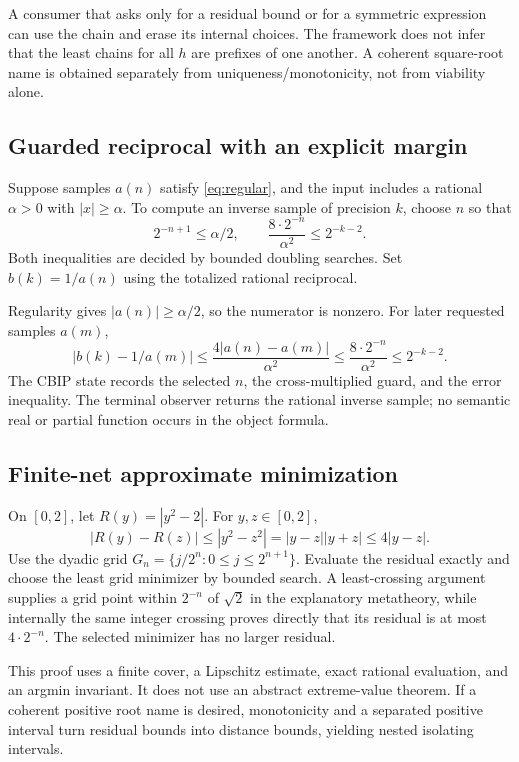 A consumer that asks only for a residual bound or for a symmetric expression can use the chain and erase its internal choices.  The framework does not infer that the least chains for all \(h\) are prefixes of one another.  A coherent square-root name is obtained separately from uniqueness/monotonicity, not from viability alone.

\subsection{Guarded reciprocal with an explicit margin}

Suppose samples \(a(n)\) satisfy \eqref{eq:regular}, and the input includes a rational \(\alpha>0\) with \(|x|\geq\alpha\).  To compute an inverse sample of precision \(k\), choose \(n\) so that
\[
  2^{-n+1}\leq\alpha/2,
  \qquad
  \frac{8\cdot2^{-n}}{\alpha^2}\leq2^{-k-2}.
\]
Both inequalities are decided by bounded doubling searches.  Set \(b(k)=1/a(n)\) using the totalized rational reciprocal.

Regularity gives \(|a(n)|\geq\alpha/2\), so the numerator is nonzero.  For later requested samples \(a(m)\),
\[
 |b(k)-1/a(m)|\leq \frac{4|a(n)-a(m)|}{\alpha^2}
 \leq \frac{8\cdot2^{-n}}{\alpha^2}\leq2^{-k-2}.
\]
The CBIP state records the selected \(n\), the cross-multiplied guard, and the error inequality.  The terminal observer returns the rational inverse sample; no semantic real or partial function occurs in the object formula.

\subsection{Finite-net approximate minimization}

On \([0,2]\), let \(R(y)=|y^2-2|\).  For \(y,z\in[0,2]\),
\[
  |R(y)-R(z)|\leq|y^2-z^2|=|y-z||y+z|\leq4|y-z|.
\]
Use the dyadic grid \(G_n=\{j/2^n:0\leq j\leq2^{n+1}\}\).  Evaluate the residual exactly and choose the least grid minimizer by bounded search.  A least-crossing argument supplies a grid point within \(2^{-n}\) of \(\sqrt2\) in the explanatory metatheory, while internally the same integer crossing proves directly that its residual is at most \(4\cdot2^{-n}\).  The selected minimizer has no larger residual.

This proof uses a finite cover, a Lipschitz estimate, exact rational evaluation, and an argmin invariant.  It does not use an abstract extreme-value theorem.  If a coherent positive root name is desired, monotonicity and a separated positive interval turn residual bounds into distance bounds, yielding nested isolating intervals.

